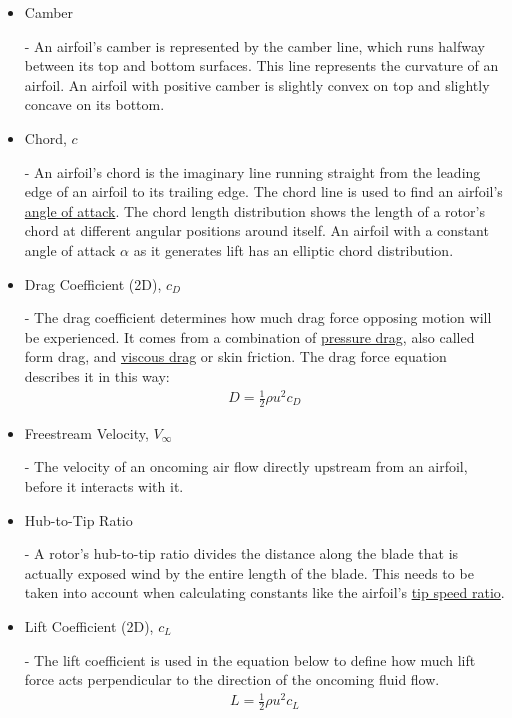 \documentclass{article}
\begin{document}
\begin{itemize}
	\item \hypertarget{Camber}{Camber} - An airfoil's camber is represented by the camber line, which runs halfway between its top and bottom surfaces. This line represents the curvature of an airfoil. An airfoil with positive camber is slightly convex on top and slightly concave on its bottom.
	
	\item \hypertarget{c}{Chord, $c$} - An airfoil's chord is the imaginary line running straight from the leading edge of an airfoil to its trailing edge. The chord line is used to find an airfoil's \hyperlink{alpha}{angle of attack}. The chord length distribution shows the length of a rotor's chord at different angular positions around itself. An airfoil with a constant angle of attack $\alpha$ as it generates lift has an elliptic chord distribution.

	\item \hypertarget{CD}{Drag Coefficient (2D), $c_{D}$} - The drag coefficient determines how much drag force opposing motion will be experienced. It comes from a combination of \hyperlink{DP}{pressure drag}, also called form drag, and \hyperlink{VD}{viscous drag} or skin friction. The drag force equation describes it in this way: 
		\begin{equation} \label{eq:13}
		\begin{aligned}
        			D = \frac{1}{2} \rho u^{2} c_{D}
	    	\end{aligned}
		\end{equation}
	
	\item \hypertarget{Vinf}{Freestream Velocity, $V_{\infty}$} - The velocity of an oncoming air flow directly upstream from an airfoil, before it interacts with it.
	
	\item \hypertarget{D/D}{Hub-to-Tip Ratio} - A rotor's hub-to-tip ratio divides the distance along the blade that is actually exposed wind by the entire length of the blade. This needs to be taken into account when calculating constants like the airfoil's \hyperlink{lambda}{tip speed ratio}.
		
	\item \hypertarget{CL}{Lift Coefficient (2D), $c_{L}$} - The lift coefficient is used in the equation below to define how much lift force acts perpendicular to the direction of the oncoming fluid flow.
		\begin{equation} \label{eq:14}
		\begin{aligned}
        			L = \frac{1}{2} \rho u^{2} c_{L}
	    	\end{aligned}
		\end{equation}
	

\end{itemize}
\end{document}
